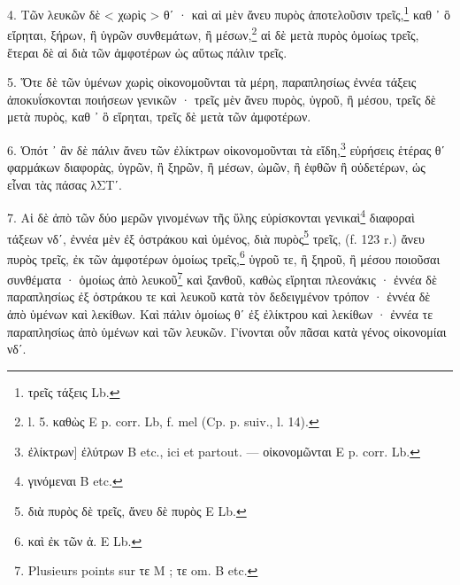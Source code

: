 \documentclass[a4paper, 11pt, oneside, polutonikogreek, french]{article}
\begin{document}
4. Τῶν λευκῶν δὲ < χωρὶς > θʹ · καὶ αἱ μὲν ἄνευ πυρὸς ἀποτελοῦσιν τρεῖς,\footnote{τρεῖς τάξεις Lb.} καθ ᾽ ὃ εἴρηται, ξήρων, ἢ ὑγρῶν συνθεμάτων, ἢ μέσων,\footnote{l. 5. καθὼς E p. corr. Lb, f. mel (Cp. p. suiv., l. 14).} αἱ δὲ μετὰ πυρὸς ὁμοίως τρεῖς, ἕτεραι δὲ αἱ διὰ τῶν ἀμφοτέρων ὡς αὕτως πάλιν τρεῖς.

5. Ὅτε δὲ τῶν ὑμένων χωρὶς οἰκονομοῦνται τὰ μέρη, παραπλησίως ἐννέα τάξεις ἀποκυΐσκονται ποιήσεων γενικῶν · τρεῖς μὲν ἄνευ πυρὸς, ὑγροῦ, ἢ μέσου, τρεῖς δὲ μετὰ πυρὸς, καθ ᾽ ὃ εἴρηται, τρεῖς δὲ μετὰ τῶν ἀμφοτέρων.

6. Ὁπότ ᾽ ἂν δὲ πάλιν ἄνευ τῶν ἐλίκτρων οἰκονομοῦνται τὰ εἴδη,\footnote{ἐλίκτρων] ἐλύτρων B etc., ici et partout. --- οἰκονομῶνται E p. corr. Lb.} εὑρήσεις ἑτέρας θʹ φαρμάκων διαφορὰς, ὑγρῶν, ἢ ξηρῶν, ἢ μέσων, ὠμῶν, ἢ ἑφθῶν ἢ οὐδετέρων, ὡς εἶναι τὰς πάσας λΣΤʹ.

7. Αἱ δὲ ἀπὸ τῶν δύο μερῶν γινομένων τῆς ὕλης εὑρίσκονται γενικαὶ\footnote{γινόμεναι B etc.} διαφοραὶ τάξεων νδʹ, ἐννέα μὲν ἐξ ὀστράκου καὶ ὑμένος, διὰ πυρὸς\footnote{διὰ πυρὸς δὲ τρεῖς, ἄνευ δὲ πυρὸς E Lb.} τρεῖς, (f. 123 r.) ἄνευ πυρὸς τρεῖς, ἐκ τῶν ἀμφοτέρων ὁμοίως τρεῖς,\footnote{καὶ ἐκ τῶν ἀ. E Lb.} ὑγροῦ τε, ἢ ξηροῦ, ἢ μέσου ποιοῦσαι συνθέματα · ὁμοίως ἀπὸ λευκοῦ\footnote{Plusieurs points sur τε M ; τε om. B etc.} καὶ ξανθοῦ, καθὼς εἴρηται πλεονάκις · ἐννέα δὲ παραπλησίως ἐξ ὀστράκου τε καὶ λευκοῦ κατὰ τὸν δεδειγμένον τρόπον · ἐννέα δὲ ἀπὸ ὑμένων καὶ λεκίθων. Καὶ πάλιν ὁμοίως θʹ ἐξ ἐλίκτρου καὶ λεκίθων · ἐννέα τε παραπλησίως ἀπὸ ὑμένων καὶ τῶν λευκῶν. Γίνονται οὖν πᾶσαι κατὰ γένος οἰκονομίαι νδʹ.
\end{document}
